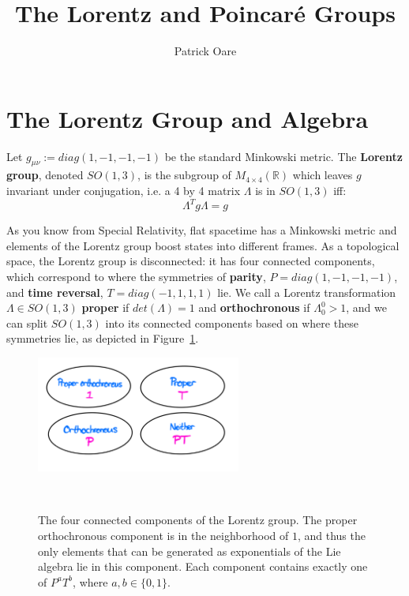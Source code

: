 \documentclass[11pt, oneside]{article}   	%
\title{The Lorentz and Poincar\'{e} Groups}
\author{Patrick Oare}
\date{}							%
\theoremstyle{definition}
\begin{document}
\maketitle
\section{The Lorentz Group and Algebra}

Let $g_{\mu\nu} := diag(1, -1, -1, -1)$ be the standard Minkowski metric. The \textbf{Lorentz group}, denoted $SO(1, 3)$, is the 
subgroup of $M_{4\times 4}(\mathbb R)$ which leaves $g$ invariant under conjugation, i.e. a 4 by 4 matrix $\Lambda$ is in 
$SO(1, 3)$ iff:
\begin{equation}
	\Lambda^T g\Lambda = g
\end{equation}

As you know from Special Relativity, flat spacetime has a Minkowski metric and elements of the Lorentz group boost states 
into different frames. As a topological space, the Lorentz group is disconnected: it has four connected components, which 
correspond to where the symmetries of \textbf{parity}, $P = diag(1, -1, -1, -1)$, and \textbf{time reversal}, $T = diag(-1, 1, 1, 1)$ 
lie. We call a Lorentz transformation $\Lambda\in SO(1, 3)$ \textbf{proper} if $det(\Lambda) = 1$ and \textbf{orthochronous} if 
$\Lambda^0_0 > 1$, and we can split $SO(1, 3)$ into its connected components based on where these symmetries lie, as 
depicted in Figure~\ref{fig:lorentz}.

\begin{figure}[H]
	\centering
	\includegraphics[width = 0.6\textwidth]{lorentz_group}
	\caption{The four connected components of the Lorentz group. The proper orthochronous component is in the neighborhood 
	of $1$, and thus the only elements that can be generated as exponentials of the Lie algebra lie in this component. Each component 
	contains exactly one of $P^a T^b$, where $a, b\in\{0, 1\}$.}~
	\label{fig:lorentz}
\end{figure}
\end{document}
